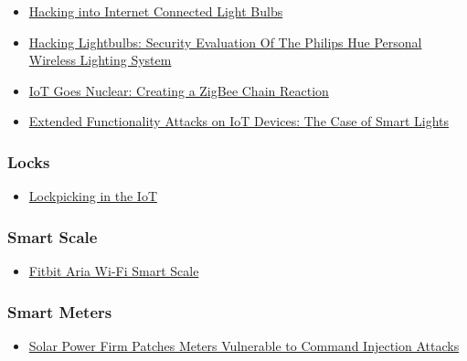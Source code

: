 \begin{itemize}
\tightlist
\item
  \href{http://www.contextis.com/resources/blog/hacking-internet-connected-light-bulbs/}{Hacking
  into Internet Connected Light Bulbs}
\item
  \href{http://www.dhanjani.com/docs/Hacking\%20Lighbulbs\%20Hue\%20Dhanjani\%202013.pdf}{Hacking
  Lightbulbs: Security Evaluation Of The Philips Hue Personal Wireless
  Lighting System}
\item
  \href{http://www.wisdom.weizmann.ac.il/~eyalro/iotworm/iotworm.pdf}{IoT
  Goes Nuclear: Creating a ZigBee Chain Reaction}
\item
  \href{https://zh.scribd.com/doc/306620189/Eyal-Ronen-and-Adi-Shamir-Hack-Lightbulbs}{Extended
  Functionality Attacks on IoT Devices: The Case of Smart Lights}
\end{itemize}

\hypertarget{locks}{%
\subsubsection{Locks}\label{locks}}

\begin{itemize}
\tightlist
\item
  \href{https://media.ccc.de/v/33c3-8019-lockpicking_in_the_iot}{Lockpicking
  in the IoT}
\end{itemize}

\hypertarget{smart-scale}{%
\subsubsection{Smart Scale}\label{smart-scale}}

\begin{itemize}
\tightlist
\item
  \href{https://www.hackerspace-bamberg.de/Fitbit_Aria_Wi-Fi_Smart_Scale}{Fitbit
  Aria Wi-Fi Smart Scale}
\end{itemize}

\hypertarget{smart-meters}{%
\subsubsection{Smart Meters}\label{smart-meters}}

\begin{itemize}
\tightlist
\item
  \href{https://threatpost.com/solar-power-firm-patches-meters-vulnerable-to-command-injection-attacks/122324/}{Solar
  Power Firm Patches Meters Vulnerable to Command Injection Attacks}
\end{itemize}

